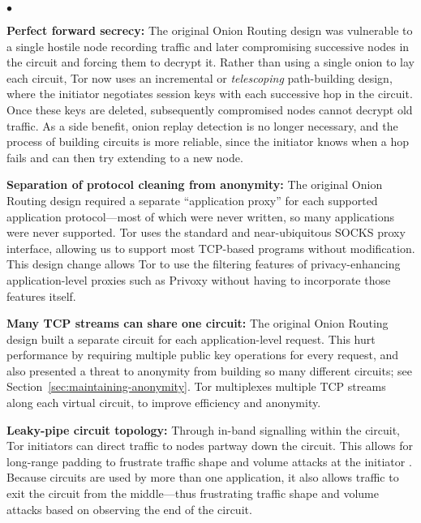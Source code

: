 \documentclass[times,10pt,twocolumn]{article}
\newenvironment{tightlist}{\begin{list}{$\bullet$}{
  \setlength{\itemsep}{0mm}
    \setlength{\parsep}{0mm}
    }}{\end{list}}
\begin{document}
\begin{tightlist}

\item \textbf{Perfect forward secrecy:} The original Onion Routing
design was vulnerable to a single hostile node recording traffic and later
compromising successive nodes in the circuit and forcing them to
decrypt it. 
Rather than using a single onion to lay each circuit,
Tor now uses an incremental or \emph{telescoping}
path-building design, where the initiator negotiates session keys with
each successive hop in the circuit.  Once these keys are deleted,
subsequently compromised nodes cannot decrypt old traffic.
As a side benefit, onion replay detection is no longer
necessary, and the process of building circuits is more reliable, since
the initiator knows when a hop fails and can then try extending to a new node.


\item \textbf{Separation of protocol cleaning from anonymity:}
The original Onion Routing design required a separate ``application
proxy'' for each
supported application protocol---most
of which were never written, so many applications were never supported.
Tor uses the standard and near-ubiquitous SOCKS
\cite{socks4} proxy interface, allowing us to support most TCP-based
programs without modification.  This design change allows Tor to
use the filtering features of privacy-enhancing
application-level proxies such as Privoxy \cite{privoxy} without having to
incorporate those features itself.

\item \textbf{Many TCP streams can share one circuit:} The original
Onion Routing design built a separate circuit for each application-level
request.
This hurt performance by requiring multiple public key operations for
every request, and also presented
a threat to anonymity from building so many different circuits; see
Section~\ref{sec:maintaining-anonymity}.
Tor multiplexes multiple TCP streams along each virtual
circuit, to improve efficiency and anonymity.

\item \textbf{Leaky-pipe circuit topology:} Through in-band signalling
within the circuit, Tor initiators can direct traffic to nodes partway
down the circuit. This allows for long-range padding to frustrate traffic
shape and volume attacks at the initiator \cite{defensive-dropping}.
Because circuits are used by more than one application, it also allows
traffic to exit the circuit from the middle---thus frustrating traffic
shape and volume attacks based on observing the end of the circuit.


\end{tightlist}
\end{document}
